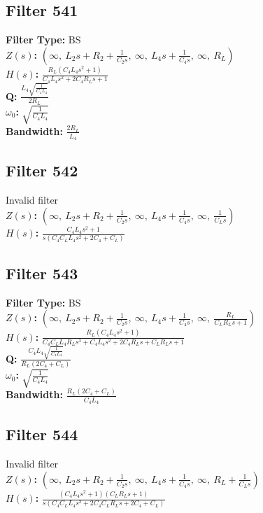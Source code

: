 \documentclass{article}
\begin{document}
\subsection*{Filter 541}
\textbf{Filter Type:} BS \\ 
\textbf{$Z(s)$:} $\left( \infty, \  L_{2} s + R_{2} + \frac{1}{C_{2} s}, \  \infty, \  L_{4} s + \frac{1}{C_{4} s}, \  \infty, \  R_{L}\right)$ \\ 
\textbf{$H(s)$:} $\frac{R_{L} \left(C_{4} L_{4} s^{2} + 1\right)}{C_{4} L_{4} s^{2} + 2 C_{4} R_{L} s + 1}$ \\ 
\textbf{Q:} $\frac{L_{4} \sqrt{\frac{1}{C_{4} L_{4}}}}{2 R_{L}}$ \\ 
\textbf{$\omega_0$:} $\sqrt{\frac{1}{C_{4} L_{4}}}$ \\ 
\textbf{Bandwidth:} $\frac{2 R_{L}}{L_{4}}$ \\ 
\subsection*{Filter 542}
Invalid filter \\ 
\textbf{$Z(s)$:} $\left( \infty, \  L_{2} s + R_{2} + \frac{1}{C_{2} s}, \  \infty, \  L_{4} s + \frac{1}{C_{4} s}, \  \infty, \  \frac{1}{C_{L} s}\right)$ \\ 
\textbf{$H(s)$:} $\frac{C_{4} L_{4} s^{2} + 1}{s \left(C_{4} C_{L} L_{4} s^{2} + 2 C_{4} + C_{L}\right)}$ \\ 
\subsection*{Filter 543}
\textbf{Filter Type:} BS \\ 
\textbf{$Z(s)$:} $\left( \infty, \  L_{2} s + R_{2} + \frac{1}{C_{2} s}, \  \infty, \  L_{4} s + \frac{1}{C_{4} s}, \  \infty, \  \frac{R_{L}}{C_{L} R_{L} s + 1}\right)$ \\ 
\textbf{$H(s)$:} $\frac{R_{L} \left(C_{4} L_{4} s^{2} + 1\right)}{C_{4} C_{L} L_{4} R_{L} s^{3} + C_{4} L_{4} s^{2} + 2 C_{4} R_{L} s + C_{L} R_{L} s + 1}$ \\ 
\textbf{Q:} $\frac{C_{4} L_{4} \sqrt{\frac{1}{C_{4} L_{4}}}}{R_{L} \left(2 C_{4} + C_{L}\right)}$ \\ 
\textbf{$\omega_0$:} $\sqrt{\frac{1}{C_{4} L_{4}}}$ \\ 
\textbf{Bandwidth:} $\frac{R_{L} \left(2 C_{4} + C_{L}\right)}{C_{4} L_{4}}$ \\ 
\subsection*{Filter 544}
Invalid filter \\ 
\textbf{$Z(s)$:} $\left( \infty, \  L_{2} s + R_{2} + \frac{1}{C_{2} s}, \  \infty, \  L_{4} s + \frac{1}{C_{4} s}, \  \infty, \  R_{L} + \frac{1}{C_{L} s}\right)$ \\ 
\textbf{$H(s)$:} $\frac{\left(C_{4} L_{4} s^{2} + 1\right) \left(C_{L} R_{L} s + 1\right)}{s \left(C_{4} C_{L} L_{4} s^{2} + 2 C_{4} C_{L} R_{L} s + 2 C_{4} + C_{L}\right)}$ \\ 
\end{document}
